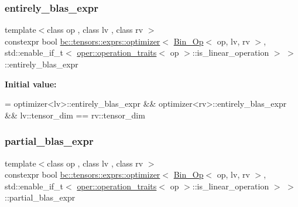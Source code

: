 \subsubsection{\texorpdfstring{entirely\+\_\+blas\+\_\+expr}{entirely\_blas\_expr}}
{\footnotesize\ttfamily template$<$class op , class lv , class rv $>$ \\
constexpr bool \hyperlink{structbc_1_1tensors_1_1exprs_1_1optimizer}{bc\+::tensors\+::exprs\+::optimizer}$<$ \hyperlink{structbc_1_1tensors_1_1exprs_1_1Bin__Op}{Bin\+\_\+\+Op}$<$ op, lv, rv $>$, std\+::enable\+\_\+if\+\_\+t$<$ \hyperlink{structbc_1_1oper_1_1operation__traits}{oper\+::operation\+\_\+traits}$<$ op $>$\+::is\+\_\+linear\+\_\+operation $>$ $>$\+::entirely\+\_\+blas\+\_\+expr\hspace{0.3cm}{\ttfamily [static]}}

{\bfseries Initial value\+:}
\begin{DoxyCode}
=
            optimizer<lv>::entirely\_blas\_expr &&
            optimizer<rv>::entirely\_blas\_expr &&
            lv::tensor\_dim == rv::tensor\_dim
\end{DoxyCode}
\mbox{\label{structbc_1_1tensors_1_1exprs_1_1optimizer_3_01Bin__Op_3_01op_00_01lv_00_01rv_01_4_00_01std_1_1en0dcf27d7e2238f62469eab81d847c552_a1b157cf98bb33b5723a90ba1ad7981ef}} 
\subsubsection{\texorpdfstring{partial\+\_\+blas\+\_\+expr}{partial\_blas\_expr}}
{\footnotesize\ttfamily template$<$class op , class lv , class rv $>$ \\
constexpr bool \hyperlink{structbc_1_1tensors_1_1exprs_1_1optimizer}{bc\+::tensors\+::exprs\+::optimizer}$<$ \hyperlink{structbc_1_1tensors_1_1exprs_1_1Bin__Op}{Bin\+\_\+\+Op}$<$ op, lv, rv $>$, std\+::enable\+\_\+if\+\_\+t$<$ \hyperlink{structbc_1_1oper_1_1operation__traits}{oper\+::operation\+\_\+traits}$<$ op $>$\+::is\+\_\+linear\+\_\+operation $>$ $>$\+::partial\+\_\+blas\+\_\+expr\hspace{0.3cm}{\ttfamily [static]}}

